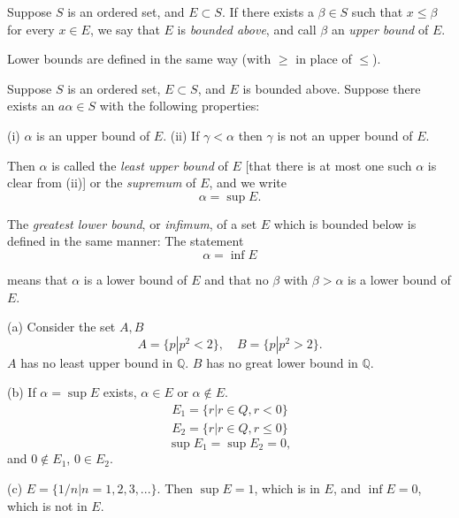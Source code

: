 
\begin{myDefinition}\label{myDefinitions:1.7}
Suppose $S$ is an ordered set, and $E \subset S$. If there exists a
$\beta \in S$ such that $x \leq \beta$ for every $x \in E$, we say that $E$ is \emph{bounded above}, and call
$\beta$ an \emph{upper bound} of $E$.

Lower bounds are defined in the same way (with $\geq$ in place of $\leq$).
\end{myDefinition}

\begin{myDefinition}\label{myDefinition:1.8}
Suppose $S$ is an ordered set, $E \subset S$, and $E$ is bounded above.
Suppose there exists an $a\alpha \in S$ with the following properties:

(i) $\alpha$ is an upper bound of $E$.
(ii) If $\gamma <\alpha$ then $\gamma$ is not an upper bound of $E$.

Then $\alpha$ is called the \emph{least upper bound} of $E$ [that there is at most one such
$\alpha$ is clear from (ii)] or the \emph{supremum} of $E$, and we write
\begin{equation*}
    \alpha = \sup E.
\end{equation*}

The \emph{greatest lower bound}, or \emph{infimum}, of a set $E$ which is bounded below
is defined in the same manner: The statement
\begin{equation*}
    \alpha = \inf E
\end{equation*}

means that $\alpha$ is a lower bound of $E$ and that no $\beta$ with $\beta > \alpha$ is a lower bound
of $E$.
\end{myDefinition}



\begin{myExample}\label{Example:1.9}
(a) Consider the set $A, B$
    \begin{equation*}
        A = \{p|p^2 < 2\},\quad
        B = \{p|p^2 > 2\}.
    \end{equation*}
    $A$ has no least upper bound in $\mathbb{Q}$.
    $B$ has no great lower bound in $\mathbb{Q}$.
    
    (b) If $\alpha = \sup E$ exists, $\alpha\in E$ or $\alpha \notin E$.
    \begin{align*}
        E_1 = \{r |r\in Q, r < 0\}\\
        E_2 = \{r |r\in Q, r \leq 0\}
    \end{align*}
    \begin{equation*}
        \sup E_1 = \sup E_2 = 0,
    \end{equation*}
    and $0\not\in E_1$, $0\in E_2$.
    
    (c) $E = \{1/n | n = 1,2,3,...\}$. Then $\sup E = 1$, which is in $E$, and $\inf E = 0$, which is not in $E$.
\end{myExample}

